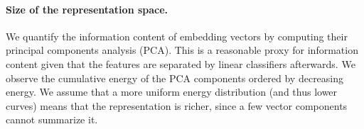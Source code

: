 \begin{table}[t]
\caption{
Top-1 accuracy of a ResNet-18 on CIFAR-100 for different training schemes. 
We report the results after finetuning of the linear classifier on the fine labels (see Section~\ref{sec:disc_gran}).
The Triplet training is unsupervised, so the two columns are the same.
\label{tab:analysis_training_schemes}}
\centering
{}
\end{table} 


\paragraph{Size of the representation space.}
\label{sec:size_space}

We quantify the information content of embedding vectors by computing their principal components analysis (PCA).
This is a reasonable proxy for information content given that the features are separated by linear classifiers afterwards. 
We observe the cumulative energy of the PCA components ordered by decreasing energy.
We assume that a more uniform energy distribution (and thus lower curves) means that the representation is richer, since a few vector components cannot summarize it. 


